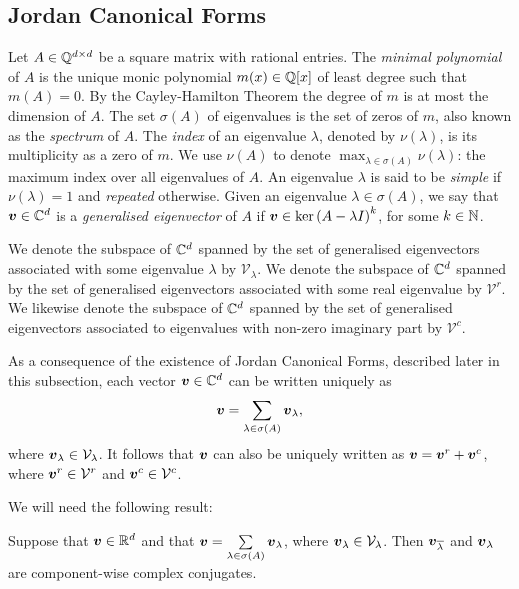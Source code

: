 \subsection{Jordan Canonical Forms}
\label{sec:jordan}

Let $A \in \mathbb{Q}^{d \times d}$ be a square matrix with rational
entries.
The \emph{minimal polynomial} of $A$ is the unique monic
polynomial $m(x) \in \mathbb{Q}[x]$ of least degree such that
$m(A)=0$.  By the Cayley-Hamilton Theorem the degree of $m$ is at most
the dimension of $A$. The set $\sigma(A)$ of eigenvalues is the set of
zeros of $m$, also known as the \emph{spectrum} of $A$.
The \emph{index} of an eigenvalue $\lambda$, denoted
by $\nu(\lambda)$, is its multiplicity as a zero of $m$. We
use $\nu(A)$ to denote $\max_{\lambda\in\sigma(A)} \nu(\lambda)$: the
maximum index over all eigenvalues of $A$. An eigenvalue $\lambda$ is said to be \emph{simple} if $\nu(\lambda) = 1$ and \emph{repeated} otherwise.
Given an eigenvalue $\lambda \in \sigma(A)$, we say that $\boldsymbol{v} \in \mathbb{C}^{d}$ is a \emph{generalised eigenvector} of $A$ if $\boldsymbol{v}\in \ker{(A-\lambda I)}^{k}$, for some $k\in\mathbb{N}$.

We denote the subspace of $\mathbb{C}^{d}$ spanned by the set of
generalised eigenvectors associated with some eigenvalue $\lambda$ by
$\mathcal{V}_{\lambda}$. We denote the subspace of $\mathbb{C}^{d}$
spanned by the set of generalised eigenvectors associated with some
real eigenvalue by $\mathcal{V}^{r}$.  We likewise denote the subspace
of $\mathbb{C}^{d}$ spanned by the set of generalised eigenvectors
associated to eigenvalues with non-zero imaginary part by
$\mathcal{V}^{c}$.

As a consequence of the existence of Jordan Canonical Forms, described later in this subsection, each vector $\boldsymbol{v}\in\mathbb{C}^{d}$
can be written uniquely as
\begin{equation}
\label{eq:eigen-decomposition}
\myvector{v}=\displaystyle{
  \sum\limits_{\lambda\in\sigma(A)}\myvector{v}_{\lambda}},
\end{equation}
where $\boldsymbol{v}_{\lambda}\in\mathcal{V}_{\lambda}$.
It follows that $\boldsymbol{v}$ can also be uniquely written as
$\boldsymbol{v}=\boldsymbol{v}^{r}+\boldsymbol{v}^{c}$, where
$\boldsymbol{v}^{r} \in\mathcal{V}^{r}$ and
$\boldsymbol{v}^{c} \in\mathcal{V}^{c}$.

We will need the following result:
\begin{proposition}
\label{conj-relation}
Suppose that $\boldsymbol{v}\in\mathbb{R}^{d}$ and that $\boldsymbol{v}=\sum\limits_{\lambda\in\sigma(A)} \boldsymbol{v}_{\lambda}$, where $\boldsymbol{v}_{\lambda} \in\mathcal{V}_{\lambda}$. Then $\boldsymbol{v}_{\overline{\lambda}}$ and $\boldsymbol{v}_{\lambda}$ are component-wise complex conjugates.
\end{proposition}

